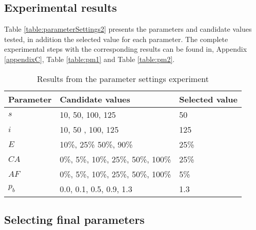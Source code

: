 


\subsection{Experimental results}
\label{subsec:parameterSettings_results}

Table \vref{table:parameterSettings2} presents the parameters and candidate values tested, in addition the selected value for each parameter. The complete experimental steps with the corresponding results can be found in, Appendix \ref{appendixC}, Table \vref{table:pm1} and Table \vref{table:pm2}. 

    \begin{table}[H]
    \centering
    \begin{tabular}{|l|l|l|}
    \hline
    \textbf{Parameter} & \textbf{Candidate values} & \textbf{Selected value}\\
    \hline
    $s$ & 10, 50, 100, 125 & 50 \\
    $i$ & 10, 50 , 100, 125 & 125\\
    $E$ & 10\%, 25\% 50\%, 90\% & 25\% \\
    $CA$ & 0\%, 5\%, 10\%, 25\%, 50\%, 100\% & 25\% \\
    $AF$ & 0\%, 5\%, 10\%, 25\%, 50\%, 100\% & 5\% \\
    $p_{b}$ & 0.0, 0.1, 0.5, 0.9, 1.3 & 1.3 \\
    \hline
    \end{tabular}
    \caption {Results from the parameter settings experiment}
    \label{table:parameterSettings2}
    \end{table}
    
\subsection{Selecting final parameters}

